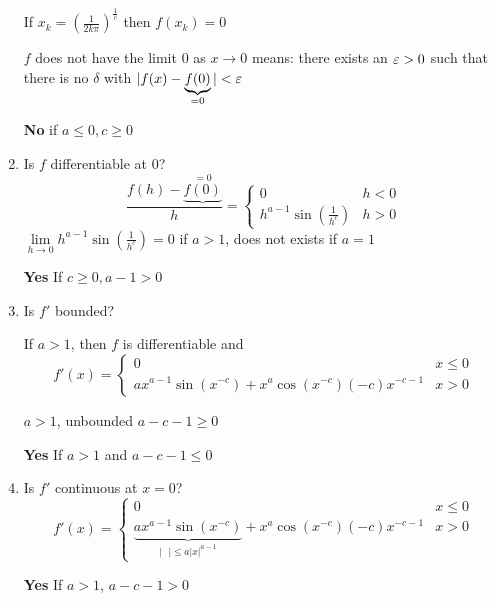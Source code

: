 \begin{example*}
\begin{enumerate}
    If $x_k = \left(\frac{1}{2k\pi}\right)^{\frac{1}{c}}$ then $f(x_k) = 0$

    $f$ does not have the limit $0$ as $x \to 0$ means: there exists an $\varepsilon > 0$ such that there is no $\delta$ with $|f(x) - \underbrace{f(0)}_{=0}| < \varepsilon$

    \textbf{No} if $a \le 0, c \ge 0$
    \item Is $f$ differentiable at $0$?
    \[\frac{f(h) - \underbrace{f(0)}^{= 0}}{h} = \begin{cases}
      0 & h < 0 \\ 
      h^{a-1}\sin\left(\frac{1}{h^c}\right) & h > 0
    \end{cases}\]
    $\lim\limits_{h \to 0} h^{a-1}\sin\left(\frac{1}{h^c}\right) = 0$ if $a > 1$, does not exists if $a = 1$

    \textbf{Yes} If $c \ge 0, a - 1 > 0$
    \item Is $f'$ bounded?

    If $a > 1$, then $f$ is differentiable and 
    \[f'(x) = \begin{cases}
      0 & x \le 0 \\ 
      ax^{a-1}\sin(x^{-c}) + x^a\cos(x^{-c})(-c)x^{-c-1} & x > 0
    \end{cases}\]

    $a > 1$, unbounded $a - c - 1 \ge 0$

    \textbf{Yes} If $a > 1$ and $a - c - 1 \le 0$
    \item Is $f'$ continuous at $x = 0$?
    \[f'(x) = \begin{cases}
      0 & x \le 0 \\ 
      \underbrace{ax^{a-1}\sin(x^{-c})}_{|\text{ }| \le a|x|^{a-1}} + x^a\cos(x^{-c})(-c)x^{-c-1} & x > 0
    \end{cases}\]
    
    \textbf{Yes} If $a > 1$, $a - c - 1 > 0$
  \end{enumerate}
\end{example*}